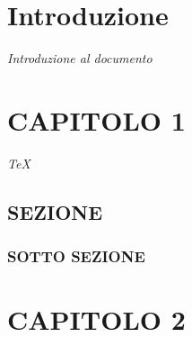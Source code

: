 \documentclass[envcountsame,envcountchap]{styles/svmono}
\begin{document}
\chapter*{Introduzione} \label{introduzione}

\vspace{2cm}

\hfill \textit{Introduzione al documento}

\vspace{0.5cm}


\chapter{CAPITOLO 1} \label{Cap.1}

\vspace{2cm}

\begin{flushright}
\textit{TeX}
\end{flushright}

\vspace{0.5cm}


\section{SEZIONE}\label{sottosezione}


\subsection{SOTTO SEZIONE}

\chapter{CAPITOLO 2} \label{Cap.2}

\vspace{2cm}

\begin{flushright}
\textit{}
\end{flushright}

\vspace{0.5cm}
\end{document}

